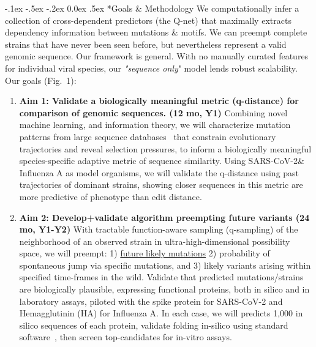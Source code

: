 \documentclass[onecolumn, compsoc,12pt]{IEEEtran}
\makeatletter
\renewcommand\paragraph{\@startsection {section}{1}{\z@}%
                                   {-.1ex \@plus -.5ex \@minus -.2ex}%
                                   {0.0ex \@plus.5ex}%
                                   {\fontsize{11}{10}\selectfont\bfseries\itshape\sffamily\color{black}}}
\def\hcov{SARS-CoV-2\xspace}
\def\infl{Influenza A\xspace}
\makeatother
\begin{document}
\paragraph*{Goals \& Methodology}
We computationally infer a collection of cross-dependent predictors (the Q-net) that maximally extracts dependency information between mutations \& motifs. We can preempt complete strains that have never been seen before, but nevertheless represent a valid genomic sequence. Our framework is general. With no manually curated features for  individual viral species, our \textit{"sequence only}" model lends robust scalability. 
Our goals (Fig.~1): \begin{enumerate} 
[label=$\square$, leftmargin=0pt,
labelindent=0em, topsep=0.1em, labelsep=*, itemsep=.25em,itemindent=1em]

\item \textbf{Aim 1: Validate  a biologically meaningful metric (q-distance) for comparison of genomic sequences. (12 mo, Y1)}  Combining novel machine learning, and  information theory, we will  characterize  mutation patterns  from large sequence databases~\cite{GISAID,Brister_2014,Hatcher_2016} that constrain evolutionary trajectories and reveal selection pressures,  to inform a biologically meaningful species-specific adaptive metric of sequence similarity. Using \hcov \& \infl as model organisms, we will validate the q-distance using past trajectories  of dominant strains, showing closer sequences in this metric are more predictive of phenotype than edit distance.%
%
\item \textbf{Aim 2: Develop+validate  algorithm preempting future variants (24 mo, Y1-Y2) } With  tractable function-aware sampling (q-sampling) of the neighborhood of an observed strain in ultra-high-dimensional  possibility space, we will preempt: 1) \uline{future likely mutations} 2) probability of spontaneous jump  via specific mutations, and 3)  likely variants arising within specified time-frames in the wild. Validate  that predicted mutations/strains  are biologically plausible,  expressing functional proteins, both  in silico and in laboratory assays, piloted with the spike protein for \hcov and Hemagglutinin (HA) for Influenza A. In each case, we will predicts 1,000 in silico sequences of each protein, validate  folding in-silico using standard software~\cite{bagdonas2021case}, then screen top-candidates for in-vitro assays.

\end{enumerate}
\end{document}
